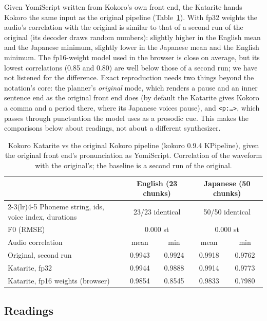 \documentclass[11pt,a4paper]{article}
\newcommand{\ys}[1]{\mbox{\texttt{#1}}}
\begin{document}
Given YomiScript written from Kokoro's own front end, the Katarite hands Kokoro the same input as the original
pipeline (Table~\ref{tab:parity}). With fp32 weights the audio's correlation with the original is similar to that of
a second run of the original (its decoder draws random numbers): slightly higher in the English mean and the Japanese
minimum, slightly lower in the Japanese mean and the English minimum. The fp16-weight model used in the browser is
close on average, but its lowest correlations (0.85 and 0.80) are well below those of a second run; we have not
listened for the difference. Exact reproduction needs two things beyond the notation's core: the planner's \emph{original}
mode, which renders a pause and an inner sentence end as the original front end does (by default the Katarite gives
Kokoro a comma and a period there, where its Japanese voices pause), and \ys{<p:…>}, which passes through punctuation
the model uses as a prosodic cue. This makes the comparisons below about readings, not about a different synthesizer.

\begin{table}[t]
\centering\small
\caption{Kokoro Katarite vs the original Kokoro pipeline (kokoro 0.9.4 KPipeline), given the original front end's
pronunciation as YomiScript. Correlation of the waveform with the original's; the baseline is a second run of the original.}
\label{tab:parity}
\begin{tabular}{lcccc}
\toprule
& \multicolumn{2}{c}{English (23 chunks)} & \multicolumn{2}{c}{Japanese (50 chunks)}\\
\cmidrule(lr){2-3}\cmidrule(lr){4-5}
Phoneme string, ids, voice index, durations & \multicolumn{2}{c}{23/23 identical} & \multicolumn{2}{c}{50/50 identical}\\
F0 (RMSE) & \multicolumn{2}{c}{0.000 st} & \multicolumn{2}{c}{0.000 st}\\
\midrule
Audio correlation & mean & min & mean & min\\
Original, second run & 0.9943 & 0.9924 & 0.9918 & 0.9762\\
Katarite, fp32 & 0.9944 & 0.9888 & 0.9914 & 0.9773\\
Katarite, fp16 weights (browser) & 0.9854 & 0.8545 & 0.9833 & 0.7980\\
\bottomrule
\end{tabular}
\end{table}

\subsection{Readings}
\end{document}

